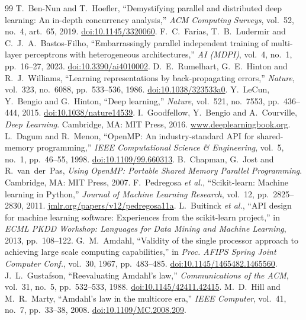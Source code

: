 \documentclass[11pt,a4paper]{article}
\begin{document}
\renewcommand{\refname}{Referencias}
\begin{thebibliography}{99}
 T.~Ben-Nun and T.~Hoefler, ``Demystifying parallel and distributed deep learning: An in-depth concurrency analysis,'' \emph{ACM Computing Surveys}, vol.~52, no.~4, art.~65, 2019. \href{https://doi.org/10.1145/3320060}{doi:10.1145/3320060}.
 F.~C.~Farias, T.~B.~Ludermir and C.~J.~A.~Bastos-Filho, ``Embarrassingly parallel independent training of multi-layer perceptrons with heterogeneous architectures,'' \emph{AI (MDPI)}, vol.~4, no.~1, pp.~16--27, 2023. \href{https://doi.org/10.3390/ai4010002}{doi:10.3390/ai4010002}.
 D.~E.~Rumelhart, G.~E.~Hinton and R.~J.~Williams, ``Learning representations by back-propagating errors,'' \emph{Nature}, vol.~323, no.~6088, pp.~533--536, 1986. \href{https://doi.org/10.1038/323533a0}{doi:10.1038/323533a0}.
 Y.~LeCun, Y.~Bengio and G.~Hinton, ``Deep learning,'' \emph{Nature}, vol.~521, no.~7553, pp.~436--444, 2015. \href{https://doi.org/10.1038/nature14539}{doi:10.1038/nature14539}.
 I.~Goodfellow, Y.~Bengio and A.~Courville, \emph{Deep Learning}. Cambridge, MA: MIT Press, 2016. \href{https://www.deeplearningbook.org}{www.deeplearningbook.org}.
 L.~Dagum and R.~Menon, ``OpenMP: An industry-standard API for shared-memory programming,'' \emph{IEEE Computational Science \& Engineering}, vol.~5, no.~1, pp.~46--55, 1998. \href{https://doi.org/10.1109/99.660313}{doi:10.1109/99.660313}.
 B.~Chapman, G.~Jost and R.~van~der~Pas, \emph{Using OpenMP: Portable Shared Memory Parallel Programming}. Cambridge, MA: MIT Press, 2007.
 F.~Pedregosa \emph{et al.}, ``Scikit-learn: Machine learning in Python,'' \emph{Journal of Machine Learning Research}, vol.~12, pp.~2825--2830, 2011. \href{http://jmlr.org/papers/v12/pedregosa11a.html}{jmlr.org/papers/v12/pedregosa11a}.
 L.~Buitinck \emph{et al.}, ``API design for machine learning software: Experiences from the scikit-learn project,'' in \emph{ECML PKDD Workshop: Languages for Data Mining and Machine Learning}, 2013, pp.~108--122.
 G.~M.~Amdahl, ``Validity of the single processor approach to achieving large scale computing capabilities,'' in \emph{Proc. AFIPS Spring Joint Computer Conf.}, vol.~30, 1967, pp.~483--485. \href{https://doi.org/10.1145/1465482.1465560}{doi:10.1145/1465482.1465560}.
 J.~L.~Gustafson, ``Reevaluating Amdahl's law,'' \emph{Communications of the ACM}, vol.~31, no.~5, pp.~532--533, 1988. \href{https://doi.org/10.1145/42411.42415}{doi:10.1145/42411.42415}.
 M.~D.~Hill and M.~R.~Marty, ``Amdahl's law in the multicore era,'' \emph{IEEE Computer}, vol.~41, no.~7, pp.~33--38, 2008. \href{https://doi.org/10.1109/MC.2008.209}{doi:10.1109/MC.2008.209}.
\end{thebibliography}
\end{document}
